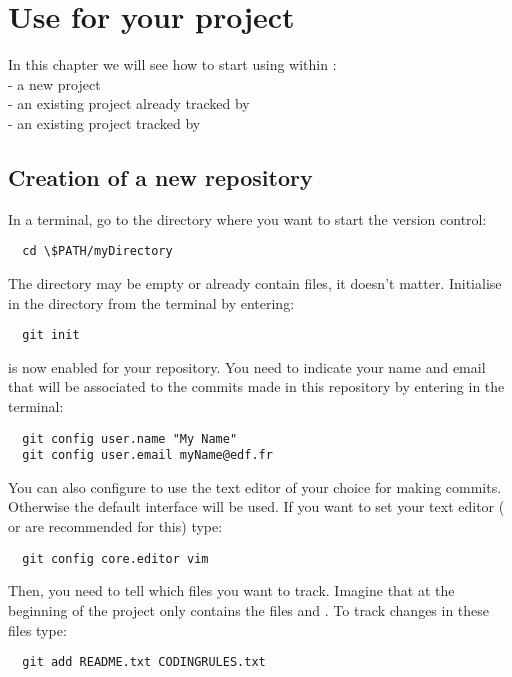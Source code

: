 \chapter{Use  for your project}

In this chapter we will see how to start using  within :\\
- a new project \\
- an existing project already tracked by  \\
- an existing project tracked by  \\

\section{Creation of a new  repository}

In a terminal, go to the directory where you want to start the version control:
\begin{lstlisting}
  cd \$PATH/myDirectory
\end{lstlisting} %
The directory may be empty or already contain files, it doesn't matter. Initialise  in the directory from the terminal by entering:
\begin{lstlisting}
  git init
\end{lstlisting}
 is now enabled for your repository.
You need to indicate your name and email that will be associated to the commits made in this repository by entering in the terminal:
\begin{lstlisting}
  git config user.name "My Name"
  git config user.email myName@edf.fr
\end{lstlisting}
You can also configure  to use the text editor of your choice for making commits.
Otherwise the default  interface will be used.
If you want to set your text editor ( or  are recommended for this) type:
\begin{lstlisting}
  git config core.editor vim
\end{lstlisting}

Then, you need to tell  which files you want to track.
Imagine that at the beginning of the project  only contains the files  and . To track changes in these files type:
\begin{lstlisting}
  git add README.txt CODINGRULES.txt
\end{lstlisting}

